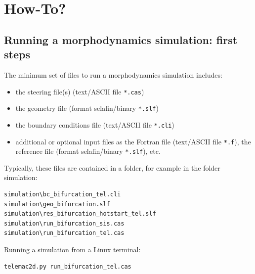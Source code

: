\chapter[How-To?]{How-To?}
\label{chap:how-to}
\pagebreak
\section{Running a morphodynamics simulation: first steps}
The minimum set of files to run a morphodynamics simulation includes:
\begin{itemize}
\item the steering file(s) (text/ASCII file \texttt{*.cas})
\item the geometry file (format selafin/binary \texttt{*.slf})
\item the boundary conditions file (text/ASCII file \texttt{*.cli})
\item additional or optional input files as the Fortran file (text/ASCII file \texttt{*.f}), the reference file (format selafin/binary \texttt{*.slf}), etc.
\end{itemize}

Typically, these files are contained in a folder, for example in the folder simulation:
\begin{footnotesize}
\begin{verbatim}
simulation\bc_bifurcation_tel.cli
simulation\geo_bifurcation.slf
simulation\res_bifurcation_hotstart_tel.slf
simulation\run_bifurcation_sis.cas
simulation\run_bifurcation_tel.cas
\end{verbatim}
\end{footnotesize}
Running a simulation from a Linux terminal:
\begin{footnotesize}
\begin{verbatim}
telemac2d.py run_bifurcation_tel.cas
\end{verbatim}
\end{footnotesize}

